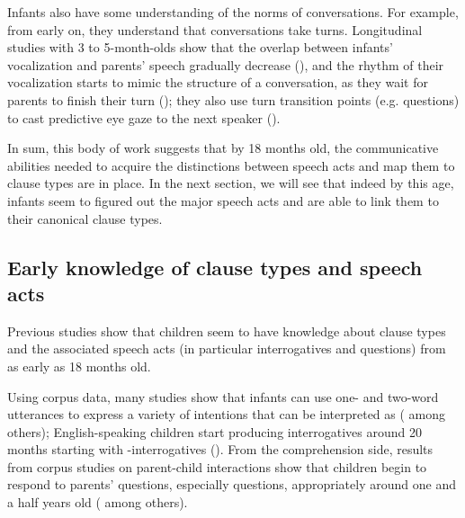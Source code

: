Infants also have some understanding of the norms of conversations. For example, from early on, they understand that conversations take turns. Longitudinal studies with 3 to 5-month-olds show that the overlap between infants' vocalization and parents' speech gradually decrease (\cite{hilbrink2013turn3mo}), and the rhythm of their vocalization starts to mimic the structure of a conversation, as they wait for parents to finish their turn (\cite{hilbrink2013turn,hilbrink2015,casillas2016corpus}); they also use turn transition points (e.g. questions) to cast predictive eye gaze to the next speaker (\cite{casillas2017turn}).

 
 
In sum, this body of work suggests that by 18 months old, the communicative abilities needed to acquire the distinctions between speech acts and map them to clause types are in place. In the next section, we will see that indeed by this age, infants seem to figured out the major speech acts and are able to link them to their canonical clause types.



\subsection{Early knowledge of clause types and speech acts} \label{sec:bg:acq:spcl}

Previous studies show that children seem to have knowledge about clause types and the associated speech acts (in particular interrogatives and questions) from as early as 18 months old. 

Using corpus data, many studies show that infants can use one- and two-word utterances to express a variety of intentions that can be interpreted as \aqrs{} (\cite{bateson1975,bates1976language,ninio1994} among others); English-speaking children start producing interrogatives around 20 months starting with \twh-interrogatives (\citealt{tyack1977, stromswold1995, rowland2003cdswh}). From the comprehension side, results from corpus studies on parent-child interactions show that children begin to respond to parents’ questions, especially  questions, appropriately around one and a half years old (\citealt{ervintripp1978, steffensen1978, shatz1978comprehension, shatz1978communicative, berningergarvey1981, shatzmccloskey1984, clark2015turn, moradlou2020} among others). 





